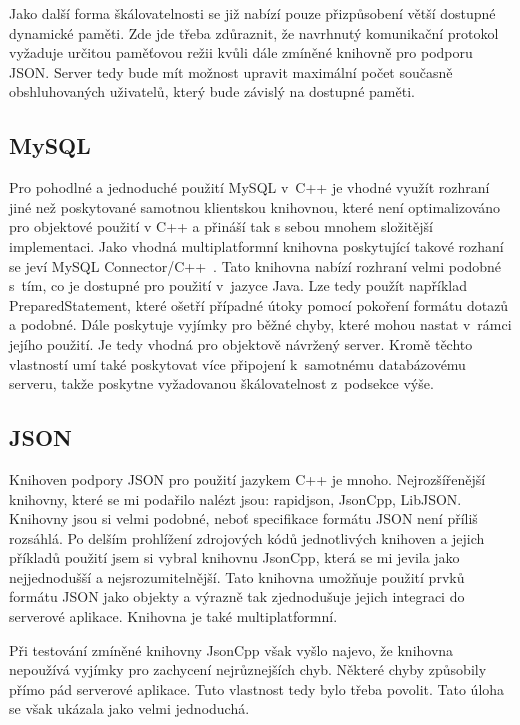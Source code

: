 \documentclass[thesis=B,czech]{FITthesis}[2013/10/20]
\begin{document}
Jako další forma škálovatelnosti se již nabízí pouze přizpůsobení větší dostupné dynamické paměti. Zde jde třeba zdůraznit, že navrhnutý komunikační protokol vyžaduje určitou paměťovou režii kvůli dále zmíněné knihovně pro podporu JSON. Server tedy bude mít možnost upravit maximální počet současně obshluhovaných uživatelů, který bude závislý na dostupné paměti.

\subsection{MySQL}

Pro pohodlné a jednoduché použití MySQL v~C++ je vhodné využít rozhraní jiné než poskytované samotnou klientskou knihovnou, které není optimalizováno pro objektové použití v C++ a přináší tak s sebou mnohem složitější implementaci. Jako vhodná multiplatformní knihovna poskytující takové rozhaní se jeví MySQL Connector/C++~\cite{mysqlconn}. Tato knihovna nabízí rozhraní velmi podobné s~tím, co je dostupné pro použití v~jazyce Java. Lze tedy použít například PreparedStatement, které ošetří případné útoky pomocí pokoření formátu dotazů a podobné. Dále poskytuje vyjímky pro běžné chyby, které mohou nastat v~rámci jejího použití. Je tedy vhodná pro objektově návržený server. Kromě těchto vlastností umí také poskytovat více připojení k~samotnému databázovému serveru, takže poskytne vyžadovanou škálovatelnost z~podsekce výše.

\subsection{JSON}

Knihoven podpory JSON pro použití jazykem C++ je mnoho. Nejrozšířenější knihovny, které se mi podařilo nalézt jsou: rapidjson, JsonCpp, LibJSON. Knihovny jsou si velmi podobné, neboť specifikace formátu JSON není příliš rozsáhlá. Po delším prohlížení zdrojových kódů jednotlivých knihoven a jejich příkladů použití jsem si vybral knihovnu JsonCpp, která se mi jevila jako nejjednodušší a nejsrozumitelnější. Tato knihovna umožňuje použití prvků formátu JSON jako objekty a výrazně tak zjednodušuje jejich integraci do serverové aplikace. Knihovna je také multiplatformní.

Při testování zmíněné knihovny JsonCpp však vyšlo najevo, že knihovna nepoužívá vyjímky pro zachycení nejrůznejších chyb. Některé chyby způsobily přímo pád serverové aplikace. Tuto vlastnost tedy bylo třeba povolit. Tato úloha se však ukázala jako velmi jednoduchá.
\end{document}

